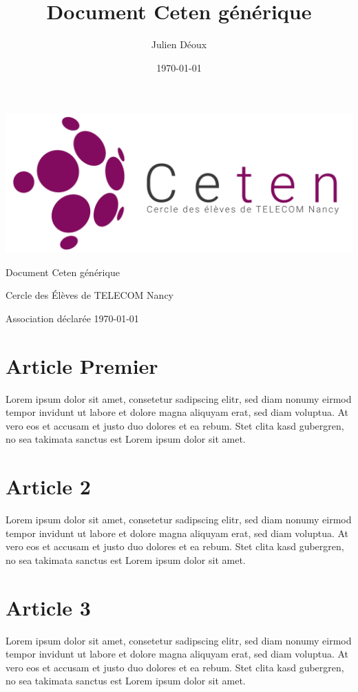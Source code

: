 \documentclass{article} %
\title{Document Ceten générique} %
\author{Julien Déoux} %
\date\today
\begin{document}

	
	\begin{titlepage}
		\begin{center}
			\includegraphics[width=\textwidth]{images/ceten.png}\par
			\vspace{3cm}
			{\Huge \light Document Ceten générique}\par
			\vfill
			{\large Cercle des Élèves de TELECOM Nancy}\par
			{\large \light Association déclarée}
			\vfill
			{\light \today}\par
		\end{center}
	\end{titlepage}


	\section*{Article Premier}
	Lorem ipsum dolor sit amet, consetetur sadipscing elitr, sed diam nonumy eirmod
	tempor invidunt ut labore et dolore magna aliquyam erat, sed diam voluptua. At
	vero eos et accusam et justo duo dolores et ea rebum. Stet clita kasd gubergren,
	no sea takimata sanctus est Lorem ipsum dolor sit amet.

	\section*{Article 2}
	Lorem ipsum dolor sit amet, consetetur sadipscing elitr, sed diam nonumy eirmod
	tempor invidunt ut labore et dolore magna aliquyam erat, sed diam voluptua. At
	vero eos et accusam et justo duo dolores et ea rebum. Stet clita kasd gubergren,
	no sea takimata sanctus est Lorem ipsum dolor sit amet.

	\section*{Article 3}
	Lorem ipsum dolor sit amet, consetetur sadipscing elitr, sed diam nonumy eirmod
	tempor invidunt ut labore et dolore magna aliquyam erat, sed diam voluptua. At
	vero eos et accusam et justo duo dolores et ea rebum. Stet clita kasd gubergren,
	no sea takimata sanctus est Lorem ipsum dolor sit amet.
\end{document}
